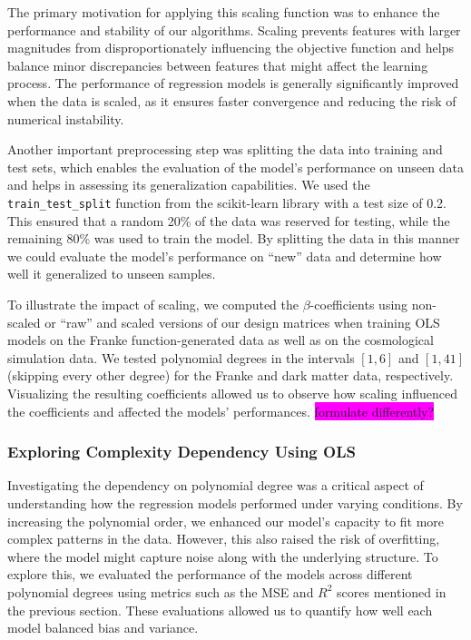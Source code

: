\documentclass[aps,pra,english,notitlepage,reprint,nofootinbib]{revtex4-1}  %
\begin{document}
The primary motivation for applying this scaling function was to enhance the performance and stability of our algorithms. Scaling prevents features with larger magnitudes from disproportionately influencing the objective function and helps balance minor discrepancies between features that might affect the learning process. The performance of regression models is generally significantly improved when the data is scaled, as it ensures faster convergence and reducing the risk of numerical instability.

Another important preprocessing step was splitting the data into training and test sets, which enables the evaluation of the model's performance on unseen data and helps in assessing its generalization capabilities. We used the \verb|train_test_split| function from the scikit-learn library with a test size of 0.2. This ensured that a random 20\% of the data was reserved for testing, while the remaining 80\% was used to train the model. By splitting the data in this manner we could evaluate the model's performance on ``new'' data and determine how well it generalized to unseen samples.

To illustrate the impact of scaling, we computed the $\beta$-coefficients using non-scaled or ``raw'' and scaled versions of our design matrices when training OLS models on the Franke function-generated data as well as on the cosmological simulation data. We tested polynomial degrees in the intervals $[1,6]$ and $[1,41]$ (skipping every other degree) for the Franke and dark matter data, respectively. Visualizing the resulting coefficients allowed us to observe how scaling influenced the coefficients and affected the models' performances. \colorbox{magenta}{formulate differently?}

\subsubsection{Exploring Complexity Dependency Using OLS}
Investigating the dependency on polynomial degree was a critical aspect of understanding how the regression models performed under varying conditions. By increasing the polynomial order, we enhanced our model's capacity to fit more complex patterns in the data. However, this also raised the risk of overfitting, where the model might capture noise along with the underlying structure. To explore this, we evaluated the performance of the models across different polynomial degrees using metrics such as the MSE and $R^2$ scores mentioned in the previous section. These evaluations allowed us to quantify how well each model balanced bias and variance. 
\end{document}

